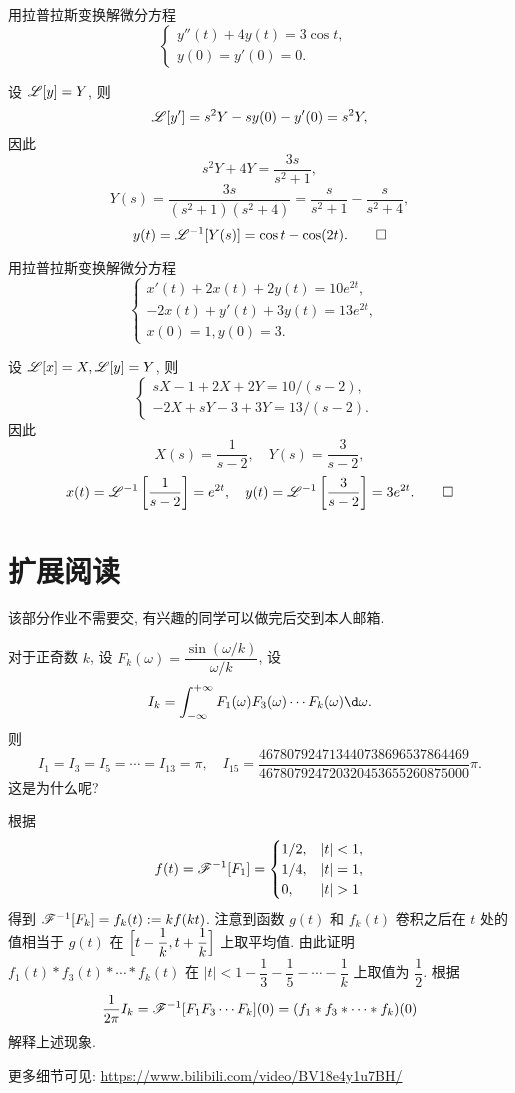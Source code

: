 \begin{exercise}
	用拉普拉斯变换解微分方程
	\[\begin{cases}y''(t)+4y(t)=3\cos t,& \\y(0)=y'(0)=0.&\end{cases}\]
\end{exercise}
\begin{solution}
	设 $\mathscr{L}[y]=Y$, 则
	\[\mathscr{L}[y']=s^2Y-sy(0)-y'(0)=s^2Y,\]
	因此
	\[s^2Y+4Y=\frac{3s}{s^2+1},\]
	\[Y(s)=\frac{3s}{(s^2+1)(s^2+4)}=\frac{s}{s^2+1}-\frac{s}{s^2+4},\]
	\[y(t)=\mathscr{L}^{-1}[Y(s)]=\cos t-\cos(2t).\qedhere\]
\end{solution}


\begin{exercise}
	用拉普拉斯变换解微分方程
	\[\begin{cases}
		x'(t)+2x(t)+2y(t)=10e^{2t},& \\
		-2x(t)+y'(t)+3y(t)=13e^{2t},& \\
		x(0)=1,y(0)=3.&
	\end{cases}\]
\end{exercise}
\begin{solution}
	设 $\mathscr{L}[x]=X,\mathscr{L}[y]=Y$, 则
		\[\begin{cases}
			sX-1+2X+2Y=10/(s-2),& \\
			-2X+sY-3+3Y=13/(s-2).&
		\end{cases}\]
	因此
	\[X(s)=\frac1{s-2},\quad Y(s)=\frac3{s-2},\]
	\[x(t)=\mathscr{L}^{-1}\left[\frac1{s-2}\right]=e^{2t},\quad
	y(t)=\mathscr{L}^{-1}\left[\frac3{s-2}\right]=3e^{2t}.\qedhere\]
\end{solution}
	
	
\section*{扩展阅读}
该部分作业不需要交, 有兴趣的同学可以做完后交到本人邮箱.
\begin{exercise}
	对于正奇数 $k$, 设 $F_k(\omega)=\dfrac{\sin(\omega/k)}{\omega/k}$, 设
	\[I_k=\int_{-\infty}^{+\infty}F_1(\omega)F_3(\omega)\cdots F_k(\omega)\d\omega.\]
	则
	\[I_1=I_3=I_5=\cdots=I_{13}=\pi,\quad
	I_{15}=\frac{467 807 924 713 440 738 696 537 864 469}{467 807 924 720 320 453 655 260 875 000}\pi.\]
	这是为什么呢?

	\subex 根据 
	\[f(t)=\msf^{-1}[F_1]=\begin{cases}
		1/2, & |t|<1,\\
		1/4, & |t|=1,\\
		0, & |t|>1
	\end{cases}\]
	得到 $\mathscr{F}^{-1}[F_k]=f_k(t):=kf(kt)$.
	\subex 注意到函数 $g(t)$ 和 $f_k(t)$ 卷积之后在 $t$ 处的值相当于 $g(t)$ 在 $\Bigl[t-\dfrac1k,t+\dfrac1k\Bigr]$ 上取平均值.
	由此证明 $f_1(t)\ast f_3(t)\ast \cdots\ast f_k(t)$ 在 $|t|<1-\dfrac13-\dfrac15-\cdots-\dfrac1k$ 上取值为 $\dfrac12$.
	\subex 根据
	\[\frac1{2\pi}I_k=\mathscr{F}^{-1}[F_1F_3\cdots F_k](0)=(f_1\ast f_3\ast\cdots\ast f_k)(0)\]
	解释上述现象.
	
	更多细节可见: \url{https://www.bilibili.com/video/BV18e4y1u7BH/}
\end{exercise}


